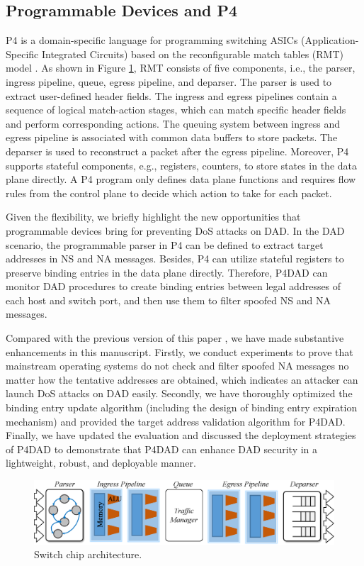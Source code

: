 \documentclass[journal]{IEEEtran}
\begin{document}
    \subsection{Programmable Devices and P4}
        P4 \cite{P4} is a domain-specific language for programming switching ASICs (Application-Specific Integrated Circuits) based on the reconfigurable match tables (RMT) model \cite{RMT}.
        As shown in Figure \ref{fig:P4Switch}, RMT consists of five components, i.e., the parser, ingress pipeline, queue, egress pipeline, and deparser.
        The parser is used to extract user-defined header fields.
        The ingress and egress pipelines contain a sequence of logical match-action stages, which can match specific header fields and perform corresponding actions. The queuing system between ingress and egress pipeline is associated with common data buffers to store packets. The deparser is used to reconstruct a packet after the egress pipeline.
        Moreover, P4 supports stateful components, e.g., registers, counters, to store states in the data plane directly.
        A P4 program only defines data plane functions and requires flow rules from the control plane to decide which action to take for each packet.
        
        Given the flexibility, we briefly highlight the new opportunities that programmable devices bring for preventing DoS attacks on DAD. In the DAD scenario, the programmable parser in P4 can be defined to extract target addresses in NS and NA messages. Besides, P4 can utilize stateful registers to preserve binding entries in the data plane directly. Therefore, P4DAD can monitor DAD procedures to create binding entries between legal addresses of each host and switch port, and then use them to filter spoofed NS and NA messages.
        
        Compared with the previous version of this paper \cite{DBLP:conf/icc/KuangLH20}, we have made substantive enhancements in this manuscript.
        Firstly, we conduct experiments to prove that mainstream operating systems do not check and filter spoofed NA messages no matter how the tentative addresses are obtained, which indicates an attacker can launch DoS attacks on DAD easily.
        Secondly, we have thoroughly optimized the binding entry update algorithm (including the design of binding entry expiration mechanism) and provided the target address validation algorithm for P4DAD.
        Finally, we have updated the evaluation and discussed the deployment strategies of P4DAD to demonstrate that P4DAD can enhance DAD security in a lightweight, robust, and deployable manner.
        \begin{figure}
                \centerline{
                    \includegraphics[scale=0.3]{figure/RMT.eps}
                }
                \caption{Switch chip architecture.}
                \label{fig:P4Switch}
        \end{figure} 
\end{document}
